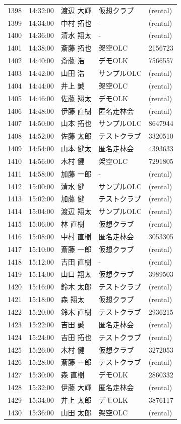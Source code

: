 \documentclass[a4paper,10pt]{ltjsarticle}
\begin{document}
\begin{longtable}{rl>{\raggedright\arraybackslash}p{}>{\raggedright\arraybackslash}p{}l}
1398 & 14:32:00 & 渡辺 大輝 & 仮想クラブ & (rental) \\
1399 & 14:34:00 & 中村 拓也 & - & (rental) \\
1400 & 14:36:00 & 清水 翔太 & - & (rental) \\
1401 & 14:38:00 & 斎藤 拓也 & 架空OLC & 2156723 \\
1402 & 14:40:00 & 斎藤 浩 & デモOLK & 7566557 \\
1403 & 14:42:00 & 山田 浩 & サンプルOLC & (rental) \\
1404 & 14:44:00 & 井上 誠 & 架空OLC & (rental) \\
1405 & 14:46:00 & 佐藤 翔太 & デモOLK & (rental) \\
1406 & 14:48:00 & 伊藤 直樹 & 匿名走林会 & (rental) \\
1407 & 14:50:00 & 山本 拓也 & サンプルOLC & 8647944 \\
1408 & 14:52:00 & 佐藤 太郎 & テストクラブ & 3320510 \\
1409 & 14:54:00 & 山本 健太 & 匿名走林会 & 4393633 \\
1410 & 14:56:00 & 木村 健 & 架空OLC & 7291805 \\
1411 & 14:58:00 & 加藤 一郎 & - & (rental) \\
1412 & 15:00:00 & 清水 健 & サンプルOLC & (rental) \\
1413 & 15:02:00 & 加藤 健 & テストクラブ & (rental) \\
1414 & 15:04:00 & 渡辺 翔太 & サンプルOLC & (rental) \\
1415 & 15:06:00 & 林 直樹 & 仮想クラブ & (rental) \\
1416 & 15:08:00 & 中村 直樹 & 匿名走林会 & 3053305 \\
1417 & 15:10:00 & 斎藤 一郎 & 仮想クラブ & (rental) \\
1418 & 15:12:00 & 吉田 直樹 & - & (rental) \\
1419 & 15:14:00 & 山口 翔太 & 仮想クラブ & 3989503 \\
1420 & 15:16:00 & 鈴木 太郎 & テストクラブ & (rental) \\
1421 & 15:18:00 & 森 翔太 & 仮想クラブ & (rental) \\
1422 & 15:20:00 & 鈴木 直樹 & テストクラブ & 2936215 \\
1423 & 15:22:00 & 吉田 誠 & 匿名走林会 & (rental) \\
1424 & 15:24:00 & 吉田 拓也 & テストクラブ & (rental) \\
1425 & 15:26:00 & 木村 健 & 仮想クラブ & 3272053 \\
1426 & 15:28:00 & 斎藤 一郎 & テストクラブ & (rental) \\
1427 & 15:30:00 & 森 直樹 & デモOLK & 2860332 \\
1428 & 15:32:00 & 伊藤 大輝 & 匿名走林会 & (rental) \\
1429 & 15:34:00 & 井上 太郎 & デモOLK & 3876117 \\
1430 & 15:36:00 & 山田 太郎 & 架空OLC & (rental) \\
\end{longtable}
\end{document}
